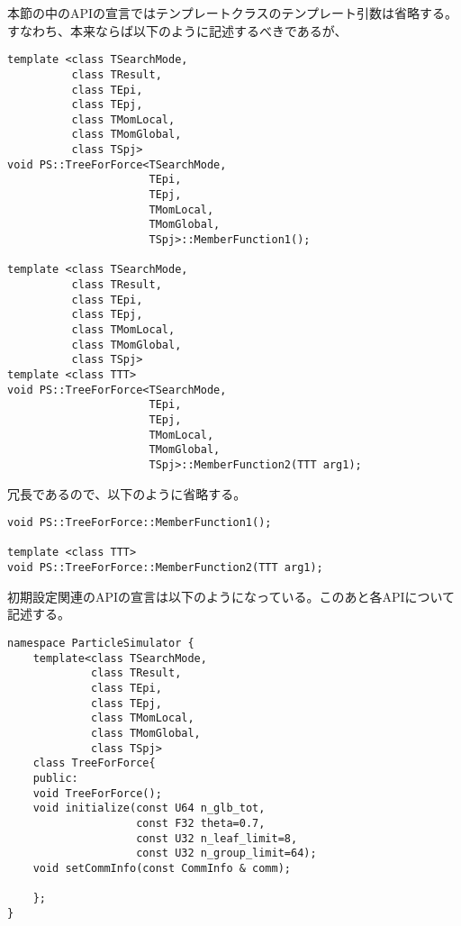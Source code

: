 本節の中のAPIの宣言ではテンプレートクラスのテンプレート引数は省略する。
すなわち、本来ならば以下のように記述するべきであるが、
\begin{screen}
\begin{verbatim}
template <class TSearchMode,
          class TResult,
          class TEpi,
          class TEpj,
          class TMomLocal,
          class TMomGlobal,
          class TSpj>
void PS::TreeForForce<TSearchMode,
                      TEpi,
                      TEpj,
                      TMomLocal,
                      TMomGlobal,
                      TSpj>::MemberFunction1();

template <class TSearchMode,
          class TResult,
          class TEpi,
          class TEpj,
          class TMomLocal,
          class TMomGlobal,
          class TSpj>
template <class TTT>
void PS::TreeForForce<TSearchMode,
                      TEpi,
                      TEpj,
                      TMomLocal,
                      TMomGlobal,
                      TSpj>::MemberFunction2(TTT arg1);
\end{verbatim}
\end{screen}
冗長であるので、以下のように省略する。
\begin{screen}
\begin{verbatim}
void PS::TreeForForce::MemberFunction1();

template <class TTT>
void PS::TreeForForce::MemberFunction2(TTT arg1);
\end{verbatim}
\end{screen}

\label{sec:treeForForceInitializeAPI}

初期設定関連のAPIの宣言は以下のようになっている。このあと各APIについて
記述する。
\begin{lstlisting}[caption=TreeForForce1]
namespace ParticleSimulator {
    template<class TSearchMode,
             class TResult,
             class TEpi,
             class TEpj,
             class TMomLocal,
             class TMomGlobal,
             class TSpj>
    class TreeForForce{
    public:
    void TreeForForce();
    void initialize(const U64 n_glb_tot,
                    const F32 theta=0.7,
                    const U32 n_leaf_limit=8,
                    const U32 n_group_limit=64);
    void setCommInfo(const CommInfo & comm);

    };
}
\end{lstlisting}

